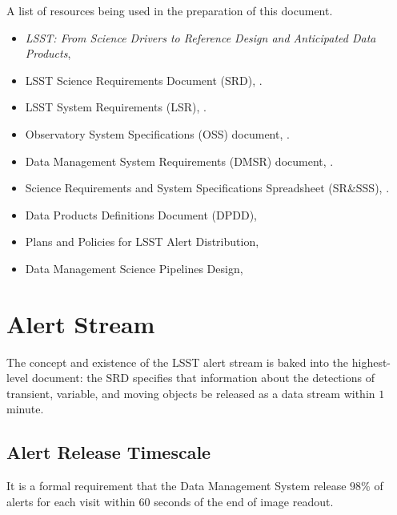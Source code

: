 \documentclass[DM,authoryear,toc]{lsstdoc}
\begin{document}
A list of resources being used in the preparation of this document.
\begin{itemize}
\item {\it LSST: From Science Drivers to Reference Design and Anticipated Data Products}, \citet{2008arXiv0805.2366I}
\item LSST Science Requirements Document (SRD), .
\item LSST System Requirements (LSR), .
\item Observatory System Specifications (OSS) document, .
\item Data Management System Requirements (DMSR) document, .
\item Science Requirements and System Specifications Spreadsheet (SR\&SSS), .
\item Data Products Definitions Document (DPDD), 
\item Plans and Policies for LSST Alert Distribution, 
\item Data Management Science Pipelines Design, 
\end{itemize}

\section{Alert Stream} \label{sec:alerts}

The concept and existence of the LSST alert stream is baked into the highest-level document: the SRD specifies that information about the detections of transient, variable, and moving objects be released as a data stream within $1$ minute. 


\subsection{Alert Release Timescale}\label{ssec:OTT1}

It is a formal requirement that the Data Management System release $98\%$ of alerts for each visit within $60$ seconds of the end of image readout.
\end{document}
